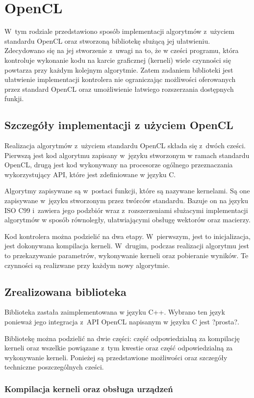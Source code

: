 \chapter{OpenCL}
\label{cha:opencl}

W~tym rodziale przedstawiono sposób implementacji algorytmów z~użyciem standardu OpenCL oraz stworzoną bibliotekę służącą jej ułatwieniu. Zdecydowano się na jej stworzenie z~uwagi na to, że w cześci programu, która kontroluje wykonanie kodu na karcie graficznej (kerneli) wiele czynności się powtarza przy każdym kolejnym algorytmie. Zatem zadaniem biblioteki jest ułatwienie implementacji kontrolera nie ograniczając możliwości oferowanych przez standard OpenCL oraz umożliwienie łatwiego rozszerzania dostępnych funkji.

\section{Szczegóły implementacji z użyciem OpenCL}  
\label{sec:szczegolyOpenCL}

Realizacja algorytmów z~użyciem standardu OpenCL składa się z~dwóch cześci. Pierwszą jest kod algorytmu zapisany w~języku stworzonym w ramach standardu OpenCL, drugą jest kod wykonywany na procesorze ogólnego przeznaczania wykorzystujący API, które jest zdefiniowane w języku C.

Algorytmy zapisywane są w~postaci funkcji, które są nazywane kernelami. Są one zapisywane w~języku stworzonym przez twórców standardu. Bazuje on na języku ISO C99 i~zawiera jego podzbiór wraz z~rozszerzeniami służacymi implementacji algorytmów w sposób równoległy, ułatwiającymi obsługę wektorów oraz macierzy. 

Kod kontrolera można podzielić na dwa etapy. W~pierwszym, jest to inicjalizacja, jest dokonywana kompilacja kerneli. W~drugim, podczas realizacji algorytmu jest to przekazywanie parametrów, wykonywanie kerneli oraz pobieranie wyników. Te czynności są realizwane przy każdym nowy algorytmie.

\section{Zrealizowana biblioteka}  
\label{sec:biblioteka}

Biblioteka zastała zaimplementowana w języku C++. Wybrano ten język ponieważ jego integracja z~API OpenCL napisanym w języku C jest ?prosta?. 

Bibliotekę można podzielić na dwie części: część odpowiedzialną za kompilację kerneli oraz wszelkie powiązane z~tym kwestie oraz część odpowiedzialną za wykonywanie kerneli.
Ponieżej są przedstawione możliwości oraz szczegóły techniczne poszczególnych cześci.

\subsection{Kompilacja kerneli oraz obsługa urządzeń}
\label{subsec:kompilacjakerneli}

